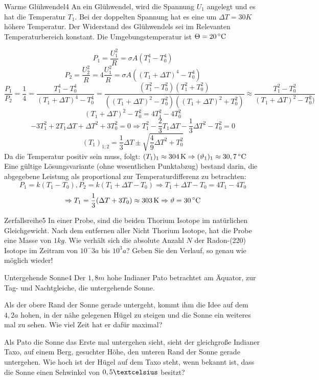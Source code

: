 



\begin{problem}{Warme Glühwendel}{4}
An ein Glühwendel, wird die Spannung $U_1$ angelegt und es hat die Temperatur $T_1$. Bei der doppelten Spannung hat es eine um $\Delta T=30\unit{K}$ höhere Temperatur. Der Widerstand des Glühwendels sei im Relevanten Temperaturbereich konstant. Die Umgebungstemperatur ist $\Theta=20\,\mathrm{^\circ C}$
\begin{solution}
$$P_1=\frac{U_1^2}R=\sigma A (T_1^4 - T_0^4)$$
$$P_2=\frac{U_2^2}R=4\frac{U_1^2}R=\sigma A ((T_1+\Delta T)^4-T_0^4)$$
$$\frac{P_1}{P_2}=\frac 14=\frac{T_1^4-T_0^4}{(T_1+\Delta T)^4-T_0^4}=\frac{(T_1^2-T_0^2)(T_1^2+T_0^2)}{((T_1+\Delta T)^2-T_0^2)((T_1+\Delta T)^2+T_0^2)}\approx\frac{T_1^2-T_0^2}{(T_1+\Delta T)^2-T_0^2)}$$
$$(T_1+\Delta T)^2-T_0^2=4T_1^2-4T_0^2$$
$$-3T_1^2+2T_1\Delta T+\Delta T^2+3T_0^2=0 \Rightarrow T_1^2-\frac 23 T_1\Delta T-\frac 13 \Delta T^2-T_0^2=0$$
$$(T_1)_{1;2}=\frac 13\Delta T\pm\sqrt{\frac 49\Delta T^2+T_0^2}$$
Da die Temperatur positiv sein muss, folgt: $(T_1)_1\approx 304\,\mathrm{K} \Rightarrow (\vartheta_1)_1 \approx 30,7\,\mathrm{^\circ C}$
Eine gültige Lösungsvariante (ohne wesentlichen Punktabzug) bestand darin, die abgegebene Leistung als proportional zur Temperaturdifferenz zu betrachten:
$$P_1=k(T_1-T_0), P_2=k(T_1+\Delta T-T_0) \Rightarrow T_1+\Delta T-T_0=4T_1-4T_0$$
$$\Rightarrow T_1=\frac 13(\Delta T+3T_0)\approx 303\,\mathrm{K}\Rightarrow \vartheta=30\,\mathrm{^\circ C}$$
\end{solution}
\end{problem}

\begin{problem}{Zerfallsreihe}{5}
In einer Probe, sind die beiden Thorium Isotope im natürlichen Gleichgewicht. Nach dem entfernen aller Nicht Thorium Isotope, hat die Probe eine Masse von $1kg$. Wie verhält sich die absolute Anzahl $N$ der Radon-(220) Isotope im Zeitram von $10^-3\unit{a}$ bis $10^3\unit{a}$? Geben Sie den Verlauf, so genau wie möglich wieder!
\end{problem}

\begin{problem}{Untergehende Sonne}{4}
Der $1,8\unit{m}$ hohe Indianer Pato betrachtet am Äquator, zur Tag- und Nachtgleiche, die untergehende Sonne.
 \begin{abcenum}
  \item Als der obere Rand der Sonne gerade untergeht, kommt ihm die Idee auf dem $4,2\unit{a}$ hohen, in der nähe gelegenen Hügel zu steigen und die Sonne ein weiteres mal zu sehen. Wie viel Zeit hat er dafür maximal?
  \item Als Pato die Sonne das Erste mal untergehen sieht, sieht der gleichgroße Indianer Taxo, auf einem Berg, gesuchter Höhe, den unteren Rand der Sonne gerade untergehen. Wie hoch ist der Hügel auf dem Taxo steht, wenn bekannt ist, dass die Sonne einen Sehwinkel von $0,5\textcelsius$ besitzt?
 \end{abcenum}
\end{problem}

